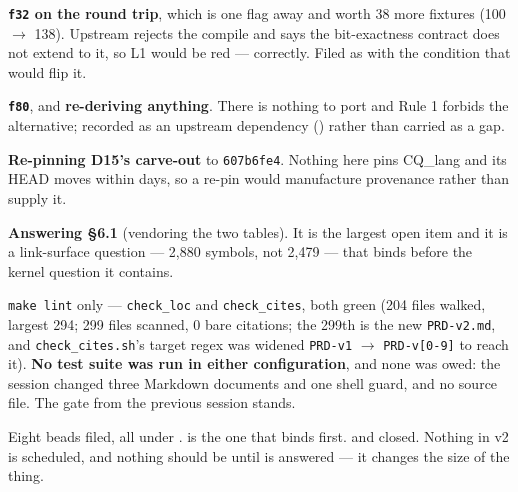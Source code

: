 \textbf{\texttt{f32} on the round trip}, which is one flag away and worth 38 more fixtures
(100 $\to$ 138). Upstream rejects the compile and says the bit-exactness contract does not
extend to it, so L1 would be red --- correctly. Filed as  with the condition that
would flip it.

\textbf{\texttt{f80}}, and \textbf{re-deriving anything}. There is nothing to port and Rule 1
forbids the alternative; recorded as an upstream dependency () rather than carried
as a gap.

\textbf{Re-pinning D15's carve-out} to \texttt{607b6fe4}. Nothing here pins CQ\_lang and its
HEAD moves within days, so a re-pin would manufacture provenance rather than supply it.

\textbf{Answering \S6.1} (vendoring the two tables). It is the largest open item and it is a
link-surface question --- 2{,}880 symbols, not 2{,}479 --- that binds before the kernel
question it contains.

\texttt{make lint} only --- \texttt{check\_loc} and \texttt{check\_cites}, both green (204
files walked, largest 294; 299 files scanned, 0 bare citations; the 299th is the new
\texttt{PRD-v2.md}, and \texttt{check\_cites.sh}'s target regex was widened
\texttt{PRD-v1} $\to$ \texttt{PRD-v[0-9]} to reach it). \textbf{No test suite was run in either
configuration}, and none was owed: the session changed three Markdown documents and one shell
guard, and no source file. The gate from the previous session stands.

Eight beads filed, all under .  is the one that binds first.  and
 closed. Nothing in v2 is scheduled, and nothing should be until  is
answered --- it changes the size of the thing.
